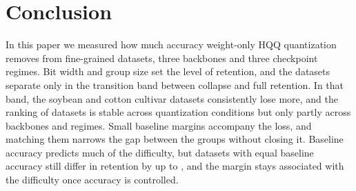 \section{Conclusion}
\label{sec:conclusion}

In this paper we measured how much accuracy weight-only HQQ quantization removes from  fine-grained datasets, three backbones and three checkpoint regimes.
Bit width and group size set the level of retention, and the datasets separate only in the transition band between collapse and full retention.
In that band, the soybean and cotton cultivar datasets consistently lose more, and the ranking of datasets is stable across quantization conditions but only partly across backbones and regimes.
Small baseline margins accompany the loss, and matching them narrows the gap between the groups without closing it.
Baseline accuracy predicts much of the difficulty, but datasets with equal baseline accuracy still differ in retention by up to , and the margin stays associated with the difficulty once accuracy is controlled.
